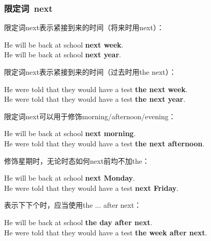 \documentclass[UTF8]{ctexart}
\newcommand{\littf}[1]{{\hspace{3pt}\ttfamily #1}}
\begin{document}
\subsubsection{限定词~\littf{next}}
    限定词\littf{next}表示紧接到来的时间（将来时用\littf{next}）：
    \begin{center}
        \large\ttfamily
        He will be back at school \textbf{next week}.\\[3mm]
        He will be back at school \textbf{next year}.\\[6mm]
    \end{center}
    限定词\littf{next}表示紧接到来的时间（过去时用\littf{the next}）：
    \begin{center}
        \large\ttfamily
        He were told that they would have a test \textbf{the next week}.\\[3mm]
        He were told that they would have a test \textbf{the next year}.\\[6mm]
    \end{center}
    限定词\littf{next}可以用于修饰\littf{morning/afternoon/evening}：
    \begin{center}
        \large\ttfamily
        He will be back at school \textbf{next morning}.\\[3mm]
        He were told that they would have a test \textbf{the next afternoon}.\\[6mm]
    \end{center}
    修饰星期时，无论时态如何\littf{next}前均不加\littf{the}：
    \begin{center}
        \large\ttfamily
        He will be back at school \textbf{next Monday}.\\[3mm]
        He were told that they would have a test \textbf{next Friday}.\\[6mm]
    \end{center}
    表示下下个时，应当使用\littf{the ... after next}：
    \begin{center}
        \large\ttfamily
        He will be back at school \textbf{the day after next}.\\[3mm]
        He were told that they would have a test \textbf{the week after next}.\\[6mm]
    \end{center}

\newpage
\end{document}

